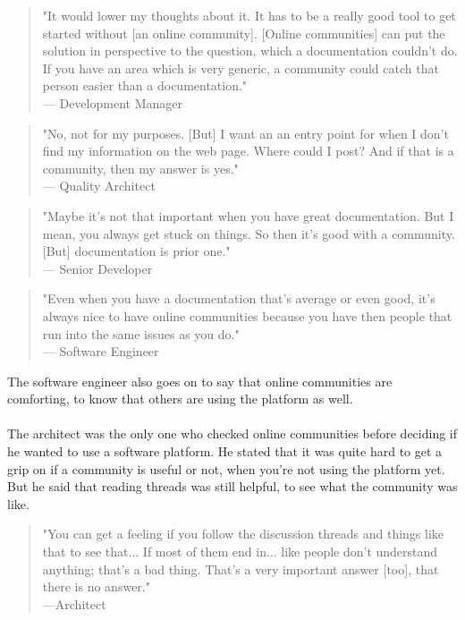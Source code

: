 \documentclass{cslthse-msc}
\begin{document}
    \begin{quote}
        "It would lower my thoughts about it. It has to be a really good tool to get started without [an online community]. [Online communities] can put the solution in perspective to the question, which a documentation couldn't do. If you have an area which is very generic, a community could catch that person easier than a documentation."\\--- Development Manager
    \end{quote}
    \begin{quote}
        "No, not for my purposes. [But] I want an an entry point for when I don't find my information on the web page. Where could I post? And if that is a community, then my answer is yes."\\ --- Quality Architect
    \end{quote}
    \begin{quote}
        "Maybe it's not that important when you have great documentation. But I mean, you always get stuck on things. So then it's good with a community. [But] documentation is prior one."\\--- Senior Developer
    \end{quote}
    \begin{quote}
        "Even when you have a documentation that's average or even good, it's always nice  to have online communities because you have then people that run into the same issues as you do." \\--- Software Engineer
    \end{quote}
    The software engineer also goes on to say that online communities are comforting, to know that others are using the platform as well.
    \\ \\
    The architect was the only one who checked online communities before deciding if he wanted to use a software platform. He stated that it was quite hard to get a grip on if a community is useful or not, when you're not using the platform yet. But he said that reading threads was still helpful, to see what the community was like.
    \begin{quote}
        "You can get a feeling if you follow the discussion threads and things like that to see that... If most of them end in... like people don't understand anything; that's a bad thing. That's a very important answer [too], that there is no answer."\\---Architect
    \end{quote}
\end{document}
